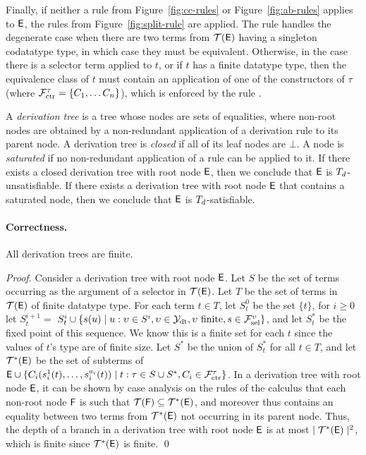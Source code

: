 
Finally, if neither a rule from Figure~\ref{fig:cc-rules} or Figure~\ref{fig:ab-rules} applies to $\mathsf{E}$, 
the rules from Figure~\ref{fig:split-rule} are applied.
The rule  handles the degenerate case when there are two terms from $\mathcal{T}(\mathsf{E})$ having a singleton codatatype type,
in which case they must be equivalent.
Otherwise, in the case there is a selector term applied to $t$, or if $t$ has a finite datatype type, 
then the equivalence class of $t$ must contain an application of one of the constructors of $\tau$ (where $\mathcal{F}_{\mathrm{ctr}}^\tau = \{ C_1, \ldots C_n \}$), 
which is enforced by the rule .

A \emph{derivation tree} is a tree whose nodes are sets of equalities, where non-root nodes are obtained by 
a non-redundant application of a derivation rule to its parent node.
A derivation tree is \emph{closed} if all of its leaf nodes are $\bot$.
A node is \emph{saturated} if no non-redundant application of a rule can be applied to it.
If there exists a closed derivation tree with root node $\mathsf{E}$, then we conclude that $\mathsf{E}$ is $T_{d}$-unsatisfiable.
If there exists a derivation tree with root node $\mathsf{E}$ that contains a saturated node, then we conclude that $\mathsf{E}$ is $T_{d}$-satisfiable. 

\paragraph{Correctness.}

\begin{lemma}[Termination] \label{lem:t}
All derivation trees are finite.
\end{lemma}
\begin{proof}
Consider a derivation tree with root node $\mathsf{E}$.
Let $S$ be the set of terms occurring as the argument of a selector in $\mathcal{T}(\mathsf{E})$.
Let $T$ be the set of terms in $\mathcal{T}(\mathsf{E})$ of finite datatype type.
For each term $t \in T$,
let $S^0_t$ be the set $\{ t \}$,
for $i \geq 0$ let $S^{i+1}_t =$ $S^i_t \cup \{ s( u ) \mid u : \upsilon \in S^i, \upsilon \in \mathcal{Y}_{\mathrm{dt}}, \upsilon \text{ finite}, s \in \mathcal{F}_{\mathrm{sel}}^{\upsilon}  \}$,
and let $S^\ast_t$ be the fixed point of this sequence.
We know this is a finite set for each $t$ since the values of $t$'s type are of finite size.
Let $S^\ast$ be the union of $S^\ast_t$ for all $t \in T$,
and let $\mathcal{T}^\ast(\mathsf{E})$ be the set of subterms of $\mathsf{E} \cup \{ C_i( s^1_i( t ), \ldots, s^{a_i}_i( t ) ) \mid t : \tau \in S \cup S^\ast, C_i \in \mathcal{F}_{\mathrm{ctr}}^\tau \}$.
In a derivation tree with root node $\mathsf{E}$, 
it can be shown by case analysis on the rules of the calculus that each non-root node $\mathsf{F}$ is such that 
$\mathcal{T}(\mathsf{F}) \subseteq \mathcal{T}^\ast(\mathsf{E})$, and moreover thus contains an equality between two terms from $\mathcal{T}^\ast(\mathsf{E})$ not occurring in its parent node.
Thus, the depth of a branch in a derivation tree with root node $\mathsf{E}$ is at most $\mid \mathcal{T}^\ast(\mathsf{E}) \mid^2$,
which is finite since $\mathcal{T}^\ast(\mathsf{E})$ is finite.
\qed
\end{proof}

